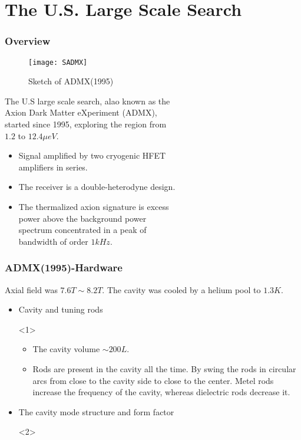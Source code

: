 \documentclass{beamer}
\begin{document}
\section{The U.S. Large Scale Search}
\begin{frame}
  \frametitle{Overview}
  \begin{wrapfigure}{l}{0.33\textwidth}
    \caption{Sketch of ADMX(1995)}
    \centering
    \texttt{[image: SADMX]}
  \end{wrapfigure}
  The U.S large scale search, alao known as the \\Axion Dark Matter eXperiment
  (ADMX), \\started since 1995, exploring the region from \\$1.2$ to $12.4\mu
  eV$. 
  \begin{itemize}
  \item Signal amplified by two cryogenic HFET \\amplifiers in series.
  \item The receiver is a double-heterodyne design.
  \item The thermalized axion signature is excess \\power above the background
  power \\spectrum concentrated in a peak of \\bandwidth of order $1kHz$.
  \end{itemize}
\end{frame}
\begin{frame}
  \frametitle{ADMX(1995)-Hardware}
  Axial field was $7.6T \sim 8.2T$. The cavity was cooled by a helium pool to
  $1.3K$. 
  \begin{itemize}
  \item Cavity and tuning rods
    \begin{onlyenv}<1>
      \begin{itemize}
      \item The cavity volume $\sim 200 L$.
      \item Rods are present in the cavity all the time. By swing the rods in
        circular arcs from close to the cavity side to close to the
        center. Metel rods increase the frequency of the cavity, whereas
        dielectric rods decrease it. 
      \end{itemize}
    \end{onlyenv}
  \item The cavity mode structure and form factor
    \begin{onlyenv}<2>
    
    \end{onlyenv}
  \end{itemize}
\end{frame}
\end{document}
